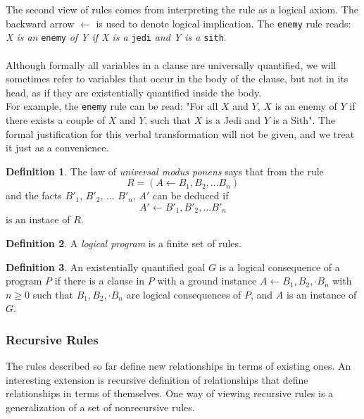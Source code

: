 \documentclass{report}
\theoremstyle{definition}
\theoremstyle{definition}
\newtheorem*{definition*}{Definition}
\newcommand{\ttt}[1]{\texttt{#1}}
\begin{document}
The second view of rules comes from interpreting the rule as a logical axiom. The backward arrow $\leftarrow$ is used to denote logical implication. The \ttt{enemy} rule reads: \textit{X is an} \ttt{enemy} \textit{of Y if X is a} \ttt{jedi} \textit{and Y is a} \ttt{sith}.\\\\
Although formally all variables in a clause are universally quantified, we will sometimes refer to variables that occur in the body of the clause, but not in its head, as if they are existentially quantified inside the body.\\

For example, the \ttt{enemy} rule can be read: "For all $X$ and $Y$, $X$ is an enemy of $Y$ if there exists a couple of $X$ and $Y$, such that $X$ is a Jedi and $Y$ is a Sith". The formal justification for this verbal transformation will not be given, and we treat it just as a convenience.
\begin{definition*}
	The law of \textit{universal modus ponens} says that from the rule $$R = (A \leftarrow B_1, B_2, \dots B_n)$$ and the facts $B'_1$, $B'_2$, $\dots$ $B'_n$, $A'$ can be deduced if  $$A' \leftarrow B'_1, B'_2, \dots B'_n$$ is an instace of $R$.
\end{definition*}
\begin{definition*}
	A \textit{logical program} is a finite set of rules.
\end{definition*}
\begin{definition*}
	An existentially quantified goal $G$ is a logical consequence of a program $P$ if there is a clause in $P$ with a ground instance $A \leftarrow B_1, B_2, \cdot B_n$ with $n \geq 0$ such that $B_1, B_2, \cdot B_n$ are logical consequences of $P$, and $A$ is an instance of $G$.
\end{definition*}
\pagebreak
\subsubsection{Recursive Rules} \label{ch:recursive-rules}
The rules described so far define new relationships in terms of existing ones. An interesting extension is recursive definition of relationships that define relationships in terms of themselves. One way of viewing recursive rules is a generalization of a set of nonrecursive rules.\\
\end{document}

